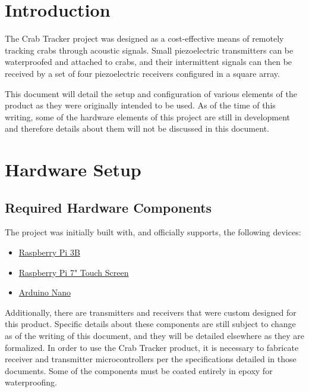 \documentclass[12pt]{article}
\begin{document}
\section{Introduction}

The Crab Tracker project was designed as a cost-effective means of remotely
tracking crabs through acoustic signals.
Small piezoelectric transmitters can be waterproofed and attached to crabs,
and their intermittent signals can then be received by a set of four
piezoelectric receivers configured in a square array.

This document will detail the setup and configuration of various elements
of the product as they were originally intended to be used.
As of the time of this writing, some of the hardware elements of this project
are still in development and therefore details about them will not be discussed
in this document.

\section{Hardware Setup}

\subsection{Required Hardware Components}

The project was initially built with, and officially supports, the following
devices:
\begin{itemize}
\item \href{https://www.raspberrypi.org/products/raspberry-pi-3-model-b/}
	{Raspberry Pi 3B}
\item \href{https://www.raspberrypi.org/products/raspberry-pi-touch-display/}
	{Raspberry Pi 7" Touch Screen}
\item \href{https://store.arduino.cc/usa/arduino-nano}{Arduino Nano}
\end{itemize}

Additionally, there are transmitters and receivers that were custom designed
for this product.
Specific details about these components are still subject to change as of the
writing of this document, and they will be detailed elsewhere as they are
formalized.
In order to use the Crab Tracker product, it is necessary to fabricate
receiver and transmitter microcontrollers per the specifications detailed
in those documents.
Some of the components must be coated entirely in epoxy for waterproofing.
\end{document}
